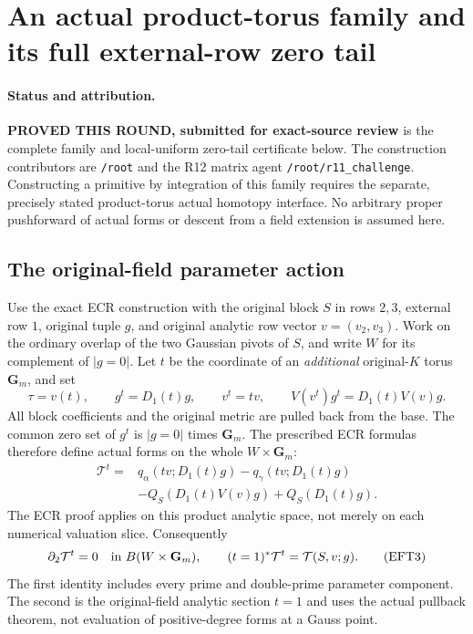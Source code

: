 \section{An actual product-torus family and its full external-row zero tail}
\label{sec:r12-external-row-torus-tail}

\paragraph{Status and attribution.}
\textbf{PROVED THIS ROUND, submitted for exact-source review} is the
complete family and local-uniform zero-tail certificate below.
The construction contributors are \texttt{/root} and the R12 matrix
agent \texttt{/root/r11\_challenge}.  Constructing a primitive by
integration of this family requires the separate, precisely stated
product-torus actual homotopy interface.  No arbitrary proper
pushforward of actual forms or descent from a field extension is
assumed here.

\subsection{The original-field parameter action}

Use the exact ECR construction with the original block $S$ in
rows $2,3$, external row $1$, original tuple $g$, and original
analytic row vector $v=(v_2,v_3)$.  Work on the ordinary overlap
of the two Gaussian pivots of $S$, and write $W$ for its complement
of $|g=0|$.  Let $t$ be the coordinate of an \emph{additional}
original-$K$ torus $\mathbf G_m$, and set
\[
 \tau=v(t),\qquad g^t=D_1(t)g,
 \qquad v^t=t v,\qquad
 V(v^t)g^t=D_1(t)V(v)g.
 \tag{EFT1}
\]
All block coefficients and the original metric are pulled back
from the base.  The common zero set of $g^t$ is $|g=0|$ times
$\mathbf G_m$.  The prescribed ECR formulas therefore define
actual forms on the whole $W\times\mathbf G_m$:
\[
 \begin{split}
 \mathcal T^t={}&q_\alpha(tv;D_1(t)g)-q_\gamma(tv;D_1(t)g)\\
 &-Q_S(D_1(t)V(v)g)+Q_S(D_1(t)g).
 \end{split}
 \tag{EFT2}
\]
The ECR proof applies on this product analytic space, not merely
on each numerical valuation slice.  Consequently
\[
                   \partial_2\mathcal T^t=0
                  \quad\hbox{in }B(W\times\mathbf G_m),
 \qquad (t=1)^*\mathcal T^t=\mathcal T(S,v;g).
 \tag{EFT3}
\]
The first identity includes every prime and double-prime parameter
component.  The second is the original-field analytic section
$t=1$ and uses the actual pullback theorem, not evaluation of
positive-degree forms at a Gauss point.


